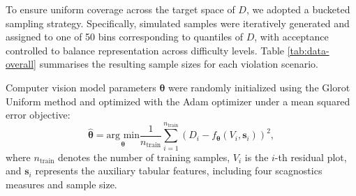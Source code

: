 \documentclass[]{interact}
\theoremstyle{plain}%
\theoremstyle{definition}
\theoremstyle{remark}
\begin{document}
To ensure uniform coverage across the target space of \(D\), we adopted
a bucketed sampling strategy. Specifically, simulated samples were
iteratively generated and assigned to one of 50 bins corresponding to
quantiles of \(D\), with acceptance controlled to balance representation
across difficulty levels. Table \ref{tab:data-overall} summarises the
resulting sample sizes for each violation scenario.

\begin{table}
\centering
\caption{\label{tab:data-overall}Number of training and test samples for each model violation scenario, including cases with multiple simultaneous violations. Each sample consists of a residual plot as input and the corresponding distance $D$ as the target. Root mean square error (RMSE) values for the training and test sets are shown for each scenario. Details of the synthetic data generating process used to construct these samples are provided in Appendix A.}
\centering
{}
\end{table}

Computer vision model parameters \(\boldsymbol{\theta}\) were randomly
initialized using the Glorot Uniform method
\citep{glorot2010understanding} and optimized with the Adam optimizer
\citep{kingma2014adam} under a mean squared error objective:
\[\hat{\boldsymbol{\theta}} = \underset{\boldsymbol{\theta}}{\text{arg min}}\frac{1}{n_{\text{train}}}\sum_{i=1}^{n_{\text{train}}}(D_i - f_{\boldsymbol{\theta}}(V_i, \boldsymbol{s}_i))^2,\]
\noindent where \(n_{\text{train}}\) denotes the number of training
samples, \(V_i\) is the \(i\)-th residual plot, and \(\boldsymbol{s}_i\)
represents the auxiliary tabular features, including four scagnostics
measures and sample size.
\end{document}

